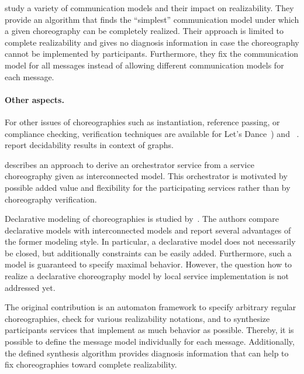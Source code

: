 \citet{KazhamiakinP_2006_forte} study a variety of communication models and their impact on realizability. They provide an algorithm that finds the ``simplest'' communication model under which a given choreography can be completely realized. Their approach is limited to complete realizability and gives no diagnosis information in case the choreography cannot be implemented by participants. Furthermore, they fix the communication model for all messages instead of allowing different communication models for each message.


\paragraph{Other aspects.}

For other issues of choreographies such as instantiation, reference passing, or compliance checking, verification techniques are available for Let's Dance~\cite{DeckerZD_2006_wsfm}) and ~\cite{BusiGGLZ_2006_coordination,Angelis_2007_yrsoc}. \citet{AlurEY_2005_tcs} report decidability results in context of  graphs.

\citet{McIlvennaDW_2009_apccm} describes an approach to derive an orchestrator service from a service choreography given as interconnected model. This orchestrator is motivated by possible added value and flexibility for the participating services rather than by choreography verification.

Declarative modeling of choreographies is studied by~\citet{MontaliPACMS_2009_tweb}. The authors compare declarative models with interconnected models and report several advantages of the former modeling style. In particular, a declarative model does not necessarily be closed, but additionally constraints can be easily added. Furthermore, such a model is guaranteed to specify maximal behavior. However, the question how to realize a declarative choreography model by local service implementation is not addressed yet.

\bigskip

The original contribution is an automaton framework to specify arbitrary regular choreographies, check for various realizability notations, and to synthesize participants services that implement as much behavior as possible. There\-by, it is possible to define the message model individually for each message. Additionally, the defined synthesis algorithm provides diagnosis information that can help to fix choreographies toward complete realizability.





